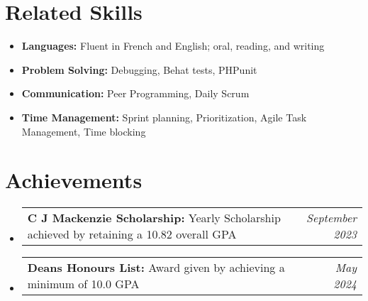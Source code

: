 \documentclass[a4paper,11pt]{article}
\makeatletter
\newcommand{\resumePOR}[3]{
\vspace{0.5mm}\item
    \begin{tabular*}{0.97\textwidth}[t]{l@{\extracolsep{\fill}}r}
        \textbf{#1}\hspace{0.3mm}#2 & \textit{\small{#3}} 
    \end{tabular*}
    \vspace{-2mm}
}
\newcommand{\resumeSubHeadingListStart}{\begin{itemize}[leftmargin=*,labelsep=0mm]}
\newcommand{\resumeSubHeadingListEnd}{\end{itemize}\vspace{2mm}}
\makeatother
\begin{document}
\section{\textbf{Related Skills}}
\begin{multicols}{2}
\begin{itemize}[leftmargin=0.05in, label={}]
    \item \textbf{Languages:} Fluent in French and English; oral, reading, and writing
    \item \textbf{Problem Solving:} Debugging, Behat tests, PHPunit
    \item \textbf{Communication:} Peer Programming, Daily Scrum
    \item \textbf{Time Management:} Sprint planning, Prioritization, Agile Task Management, Time blocking
\end{itemize}
\end{multicols}
\vspace{-10pt}


\section{\textbf{Achievements}}
\resumeSubHeadingListStart
\resumePOR{C J Mackenzie Scholarship: }{Yearly Scholarship achieved by retaining a 10.82 overall GPA}{September 2023}
\resumePOR{Deans Honours List: }{Award given by achieving a minimum of 10.0 GPA}{May 2024}
\resumeSubHeadingListEnd
\vspace{-5mm}



\end{document}
